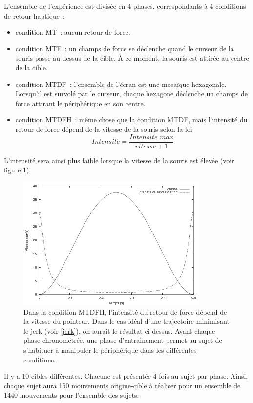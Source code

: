 \documentclass[
]{book}
\providecommand{\tightlist}{%
  \setlength{\itemsep}{0pt}\setlength{\parskip}{0pt}}
\begin{document}
L'ensemble de l'expérience est divisée en 4 phases, correspondants à 4
conditions de retour haptique~:

\begin{itemize}
\tightlist
\item
  condition MT~: aucun retour de force.
\item
  condition MTF~: un champs de force se déclenche quand
  le curseur de la souris passe au dessus de la cible. À ce moment, la souris
  est attirée au centre de la cible.
\item
  condition MTDF~: l'ensemble de l'écran est une
  mosaïque hexagonale. Lorsqu'il est survolé par le curseur, chaque hexagone
  déclenche un champs de force attirant le périphérique en son centre.
\item
  condition MTDFH~: même chose que la condition MTDF,
  mais l'intensité du retour de force dépend de la vitesse de la souris selon
  la loi
  \[
  Intensit\acute{e}=\frac{Intensit\acute{e}\_{max}}{vitesse+1}\]
\end{itemize}

L'intensité sera ainsi plus faible lorsque la vitesse de la
souris est élevée (voir figure \ref{fig:intensite}).

\begin{figure}
\centering
\includegraphics{img/entensite.png}
\caption{\label{fig:intensite}Dans la condition MTDFH, l'intensité du retour de force
dépend de la vitesse du pointeur. Dans le cas idéal d'une trajectoire
minimisant le jerk (voir \ref{jerk}), on aurait le résultat ci-dessus.
Avant chaque phase chronométrée, une phase d'entraînement permet au sujet de
s'habituer à manipuler le périphérique dans les différentes
conditions.}
\end{figure}

Il y a 10 cibles différentes. Chacune est présentée 4 fois au sujet par
phase. Ainsi, chaque sujet aura 160 mouvements origine-cible à réaliser pour
un ensemble de 1440 mouvements pour l'ensemble des sujets.
\end{document}
